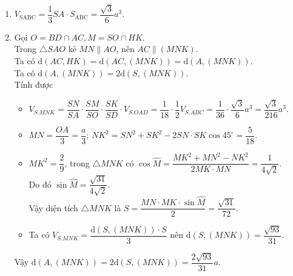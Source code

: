 \begin{bt}
{\begin{enumerate}
		\item $V_{\text{SABC}}=\dfrac{1}{3} S A \cdot S_{\text{ABC}}=\dfrac{\sqrt{3}}{6} a^3$.\\
		\item Gọi $O=B D \cap A C, M=S O \cap H K$.\\
		Trong $\triangle SAO$ kẻ $MN \parallel AO$, nên $AC\parallel (MNK)$.\\
		Ta có $\mathrm{d}(AC,HK)=\mathrm{d}(AC,(MNK))=\mathrm{d}(A,(MNK))$.\\
		Ta có $\mathrm{d}(A,(MNK))=2\mathrm{d}(S,(MNK))$.\\
		Tính được 
		\begin{itemize}
			\item $V_{S.MNK}=\dfrac{SN}{SA}\cdot \dfrac{SM}{SO}\cdot \dfrac{SK}{SD}\cdot V_{S.OAD}=\dfrac{1}{18}\cdot \dfrac{1}{2}V_{S.ABC}=\dfrac{1}{36}\cdot \dfrac{\sqrt{3}}{6} a^3=\dfrac{\sqrt{3}}{216}a^3$.
			\item $MN=\dfrac{OA}{3}=\dfrac{a}{3}$; $NK^2=SN^2+SK^2-2SN\cdot SK\cos 45^\circ=\dfrac{5}{18}$.
			\item $MK^2=\dfrac{2}{9}$, trong $\triangle MNK$ có $\cos \widehat{M}=\dfrac{MK^2+MN^2-NK^2}{2MK\cdot MN}=\dfrac{1}{4\sqrt{2}}$.\\ Do đó $\sin \widehat{M}=\dfrac{\sqrt{31}}{4\sqrt{2}}$. \\Vậy diện tích $\triangle MNK$ là $S=\dfrac{MN\cdot MK\cdot \sin \widehat{M}}{2}=\dfrac{\sqrt{31}}{72}$.
			\item Ta có $V_{S.MNK}=\dfrac{\mathrm{d}(S,(MNK))\cdot S}{3}$ nên $\mathrm{d}(S,(MNK))=\dfrac{\sqrt{93}}{31}$.
		\end{itemize}
		Vậy $\mathrm{d}(A,(MNK))=2\mathrm{d}(S,(MNK))=\dfrac{2 \sqrt{93}}{31}a$.
		\end{enumerate}
	}
\end{bt}

